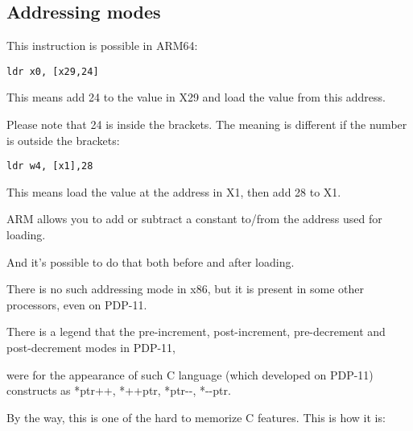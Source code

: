 ﻿\subsection{Addressing modes}
\label{ARM_postindex_vs_preindex}
\myindex{\CLanguageElements!\PostIncrement}
\myindex{\CLanguageElements!\PostDecrement}
\myindex{\CLanguageElements!\PreIncrement}
\myindex{\CLanguageElements!\PreDecrement}

This instruction is possible in ARM64:

\begin{lstlisting}
ldr	x0, [x29,24]
\end{lstlisting}

This means add 24 to the value in X29 and load the value from this address.

Please note that 24 is inside the brackets.
The meaning is different if the number is outside the brackets:

\begin{lstlisting}
ldr	w4, [x1],28
\end{lstlisting}

This means load the value at the address in X1, then add 28 to X1.


ARM allows you to add or subtract a constant to/from the address used for loading.

And it's possible to do that both before and after loading.

There is no such addressing mode in x86, but it is present in some other processors, even on PDP-11.

There is a legend that the pre-increment, post-increment, pre-decrement and post-decrement modes in PDP-11,

were  for the appearance of such C language (which developed on PDP-11) constructs as
*ptr++, *++ptr, *ptr-{}-, *-{}-ptr. 

By the way, this is one of the hard to memorize C features.
This is how it is:

